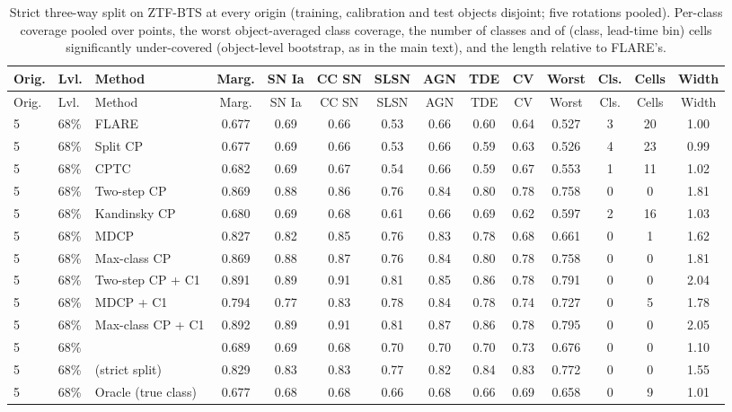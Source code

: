 \begin{longtable}{lllccccccccccc}
\caption{Strict three-way split on ZTF-BTS at every origin (training, calibration and test objects disjoint; five rotations pooled). Per-class coverage pooled over points, the worst object-averaged class coverage, the number of classes and of (class, lead-time bin) cells significantly under-covered (object-level bootstrap, as in the main text), and the length relative to FLARE's.}
\label{tab:strict}\\
\toprule
Orig. & Lvl. & Method & Marg. & SN Ia & CC SN & SLSN & AGN & TDE & CV & Worst & Cls. & Cells & Width \\
\midrule
\endfirsthead
\toprule
Orig. & Lvl. & Method & Marg. & SN Ia & CC SN & SLSN & AGN & TDE & CV & Worst & Cls. & Cells & Width \\
\midrule
\endhead
5 & 68\% & FLARE & 0.677 & 0.69 & 0.66 & 0.53 & 0.66 & 0.60 & 0.64 & 0.527 & 3 & 20 & 1.00 \\
5 & 68\% & Split CP & 0.677 & 0.69 & 0.66 & 0.53 & 0.66 & 0.59 & 0.63 & 0.526 & 4 & 23 & 0.99 \\
5 & 68\% & CPTC & 0.682 & 0.69 & 0.67 & 0.54 & 0.66 & 0.59 & 0.67 & 0.553 & 1 & 11 & 1.02 \\
5 & 68\% & Two-step CP & 0.869 & 0.88 & 0.86 & 0.76 & 0.84 & 0.80 & 0.78 & 0.758 & 0 & 0 & 1.81 \\
5 & 68\% & Kandinsky CP & 0.680 & 0.69 & 0.68 & 0.61 & 0.66 & 0.69 & 0.62 & 0.597 & 2 & 16 & 1.03 \\
5 & 68\% & MDCP & 0.827 & 0.82 & 0.85 & 0.76 & 0.83 & 0.78 & 0.68 & 0.661 & 0 & 1 & 1.62 \\
5 & 68\% & Max-class CP & 0.869 & 0.88 & 0.87 & 0.76 & 0.84 & 0.80 & 0.78 & 0.758 & 0 & 0 & 1.81 \\
5 & 68\% & Two-step CP + C1 & 0.891 & 0.89 & 0.91 & 0.81 & 0.85 & 0.86 & 0.78 & 0.791 & 0 & 0 & 2.04 \\
5 & 68\% & MDCP + C1 & 0.794 & 0.77 & 0.83 & 0.78 & 0.84 & 0.78 & 0.74 & 0.727 & 0 & 5 & 1.78 \\
5 & 68\% & Max-class CP + C1 & 0.892 & 0.89 & 0.91 & 0.81 & 0.87 & 0.86 & 0.78 & 0.795 & 0 & 0 & 2.05 \\
5 & 68\% & \gamut{} & 0.689 & 0.69 & 0.68 & 0.70 & 0.70 & 0.70 & 0.73 & 0.676 & 0 & 0 & 1.10 \\
5 & 68\% & \gamut{} (strict split) & 0.829 & 0.83 & 0.83 & 0.77 & 0.82 & 0.84 & 0.83 & 0.772 & 0 & 0 & 1.55 \\
5 & 68\% & Oracle (true class) & 0.677 & 0.68 & 0.68 & 0.66 & 0.68 & 0.66 & 0.69 & 0.658 & 0 & 9 & 1.01 \\

\end{longtable}
